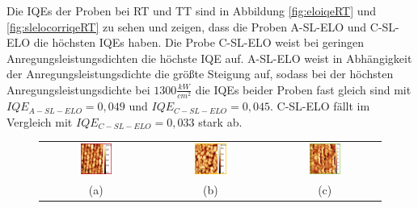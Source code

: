 \noindent 
%
Die IQEs der Proben bei RT und TT sind in Abbildung \ref{fig:eloiqeRT} und \ref{fig:slelocorriqeRT} zu sehen und zeigen, dass die Proben A-SL-ELO und C-SL-ELO die höchsten IQEs haben. Die Probe C-SL-ELO weist bei geringen Anregungsleistungsdichten die höchste IQE auf. A-SL-ELO weist in Abhängigkeit der Anregungsleistungsdichte die größte Steigung auf, sodass bei der höchsten Anregungsleistungsdichte bei $ 1300 \frac{kW}{cm^2} $ die IQEs beider Proben fast gleich sind mit $IQE_{A-SL-ELO} = 0,049 $ und $IQE_{C-SL-ELO} = 0,045$. C-SL-ELO fällt im Vergleich mit $IQE_{C-SL-ELO} = 0,033$ stark ab.  
%
\begin{figure}[H]
\begin{tabular}{ccc}
  \includegraphics[width=0.30\textwidth]{Bilder/TS4048/aSLELOafm.png} & \includegraphics[width=0.30\textwidth]{Bilder/TS4048/bSLELOafm.png}  & \includegraphics[width=0.30\textwidth]{Bilder/TS4048/cSLELOafm.png} \\
(a) & (b) & (c) \\[6pt]

\end{tabular}
\end{figure}
